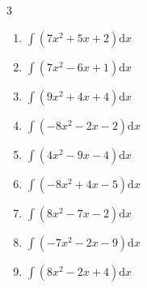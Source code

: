 


\setcounter{quesnum}{30}

\begin{multicols}{3}
\begin{enumerate}
  \itemsep=20pt
  \item $\displaystyle \int \left( 7x^{2}+5x+2 \right) \mathrm{d}x$


  \item $\displaystyle \int \left( 7x^{2}-6x+1 \right) \mathrm{d}x$


  \item $\displaystyle \int \left( 9x^{2}+4x+4 \right) \mathrm{d}x$


  \item $\displaystyle \int \left( -8x^{2}-2x-2 \right) \mathrm{d}x$


  \item $\displaystyle \int \left( 4x^{2}-9x-4 \right) \mathrm{d}x$


  \item $\displaystyle \int \left( -8x^{2}+4x-5 \right) \mathrm{d}x$


  \item $\displaystyle \int \left( 8x^{2}-7x-2 \right) \mathrm{d}x$


  \item $\displaystyle \int \left( -7x^{2}-2x-9 \right) \mathrm{d}x$


  \item $\displaystyle \int \left( 8x^{2}-2x+4 \right) \mathrm{d}x$



\end{enumerate}
\end{multicols}
